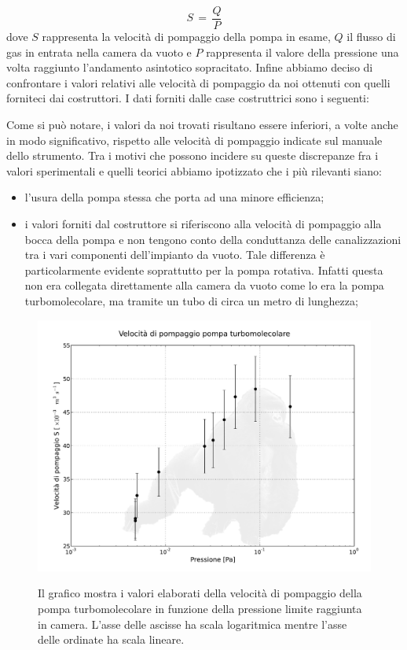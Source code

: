 \begin{equation}
	S \,=\, \frac{Q}{P}
\end{equation}
%
dove $S$ rappresenta la velocità di pompaggio della pompa in esame, $Q$ il flusso di gas in entrata nella camera da vuoto e $P$ rappresenta il valore della pressione una volta raggiunto l'andamento asintotico sopracitato. 
%
%
%
%
Infine abbiamo deciso di confrontare i valori relativi alle velocità di pompaggio da noi ottenuti con quelli forniteci dai costruttori. I dati forniti dalle case costruttrici sono i seguenti:
%
%

Come si può notare, i valori da noi trovati risultano essere inferiori, a volte anche in modo significativo, rispetto alle velocità di pompaggio indicate sul manuale dello strumento.
Tra i motivi che possono incidere su queste discrepanze fra i valori sperimentali e quelli teorici abbiamo ipotizzato che i più rilevanti siano:

\begin{itemize}
	\item{l'usura della pompa stessa che porta ad una minore efficienza;}
	\item{i valori forniti dal costruttore si riferiscono alla velocità di pompaggio alla bocca della pompa e non tengono conto della conduttanza delle canalizzazioni tra i vari componenti dell'impianto da vuoto. Tale differenza è particolarmente evidente soprattutto per la pompa rotativa. Infatti questa non era collegata direttamente alla camera da vuoto come lo era la pompa turbomolecolare, ma tramite un tubo di circa un metro di lunghezza;}%
\end{itemize}



\begin{figure}[b]
	\centering
		\includegraphics[width=14cm]{turbo.pdf}
		\label{fig:turbo}
	\caption{Il grafico mostra i valori elaborati della velocità di pompaggio della pompa turbomolecolare in funzione della pressione limite raggiunta in camera. L'asse delle ascisse ha scala logaritmica mentre l'asse delle ordinate ha scala lineare.}
\end{figure}
